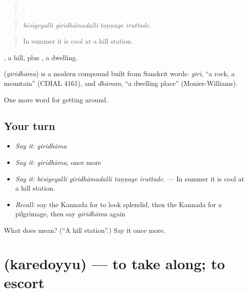 \begin{quote}
   .
\end{quote}

\begin{quote}
\emph{bēsigeyalli giridhāmadalli taṇṇage iruttade.}
\end{quote}

\begin{quote}
In summer it is cool at a hill station.
\end{quote}

, a hill, plus , a dwelling.

\begin{cousinweb}
\textbf{} (\emph{giridhāma}) is a modern compound built from Sanskrit words: \emph{giri}, \textquotedblleft{}a rock, a mountain\textquotedblright{} (CDIAL 4161), and \emph{dhāman}, \textquotedblleft{}a dwelling place\textquotedblright{} (Monier-Williams).
\end{cousinweb}

\begin{grammarlens}[title={What you've built}]
One more word for getting around.
\end{grammarlens}

\subsection*{Your turn}
\begin{itemize}
\raggedright
  \item \emph{Say it:} \emph{giridhāma}
  \item \emph{Say it:} \emph{giridhāma}, once more
  \item \emph{Say it:} \emph{bēsigeyalli giridhāmadalli taṇṇage iruttade.} — In summer it is cool at a hill station.
  \item \emph{Recall:} say the Kannada for to look splendid, then the Kannada for a pilgrimage, then say \emph{giridhāma} again
\end{itemize}

\begin{tcolorbox}[breakable,colback=teal!4,colframe=teal!35!black,title={Before you move on}]
What does  mean? (\textquotedblleft{}A hill station\textquotedblright{}.) Say it once more.
\end{tcolorbox}
\section[\texorpdfstring{\kn{ಕರೆದೊಯ್ಯು} (karedoyyu)}{ಕರೆದೊಯ್ಯು (karedoyyu)}]{ (karedoyyu) — to take along; to escort}

